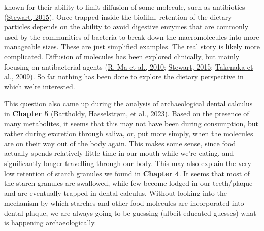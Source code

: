 \documentclass[
  letterpaper,
]{book}
\begin{document}
known for their ability to limit diffusion of some molecule, such as
antibiotics
(\protect\hyperlink{ref-stewartAntimicrobialTolerance2015}{Stewart,
2015}). Once trapped inside the biofilm, retention of the dietary
particles depends on the ability to avoid digestive enzymes that are
commonly used by the communities of bacteria to break down the
macromolecules into more manageable sizes. These are just simplified
examples. The real story is likely more complicated. Diffusion of
molecules has been explored clinically, but mainly focusing on
antibacterial agents (\protect\hyperlink{ref-maModelingDiffusion2010}{R.
Ma et al., 2010};
\protect\hyperlink{ref-stewartAntimicrobialTolerance2015}{Stewart,
2015};
\protect\hyperlink{ref-takenakaDiffusionMacromolecules2009}{Takenaka et
al., 2009}). So far nothing has been done to explore the dietary
perspective in which we're interested.

This question also came up during the analysis of archaeological dental
calculus in \protect\hyperlink{mb11CalculusPilot}{\textbf{Chapter 5}}
(\protect\hyperlink{ref-bartholdyMultiproxyAnalysis2023}{Bartholdy,
Hasselstrøm, et al., 2023}). Based on the presence of many metabolites,
it seems that this may not have been during consumption, but rather
during excretion through saliva, or, put more simply, when the molecules
are on their way out of the body again. This makes some sense, since
food actually spends relatively little time in our mouth while we're
eating, and significantly longer travelling through our body. This may
also explain the very low retention of starch granules we found in
\protect\hyperlink{byoc-starch}{\textbf{Chapter 4}}. It seems that most
of the starch granules are swallowed, while few become lodged in our
teeth/plaque and are eventually trapped in dental calculus. Without
looking into the mechanism by which starches and other food molecules
are incorporated into dental plaque, we are always going to be guessing
(albeit educated guesses) what is happening archaeologically.
\end{document}
